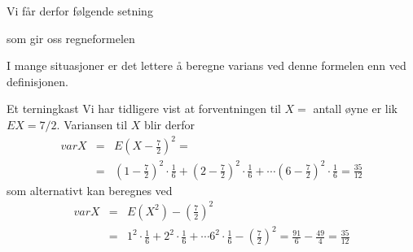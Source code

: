 \noindent Vi får derfor følgende setning

\begin{center} \framebox[10cm]{\begin{minipage}{9cm}
 \[ \mbox{\ \ \ V3. \ \ \ \ }varX = E(X^2) - (EX)^2 \]
\mbox{} \end{minipage}} \end{center}
\noindent som gir oss regneformelen

\begin{center} \framebox[10cm]{\begin{minipage}{9cm}
\[ \mbox{\ \ \ V4. \ \ \ \ }  varX = \sum_{x}x^2p(x)-{(EX)}^2 \]
\mbox{} \end{minipage}} \end{center}

\noindent I mange situasjoner er det lettere å beregne varians ved denne
formelen enn ved definisjonen.\\                    
                                                      
\begin{eksempel}{Et terningkast}
Vi har tidligere vist at forventningen til $X =$ antall øyne er
lik $EX=7/2$. Variansen til $X$ blir derfor
\begin{eqnarray*}
 varX&=&E{(X-\frac{7}{2})}^2= \\ &=& {(1-\frac{7}{2})}^2 \cdot
\frac{1}{6}+ {(2-\frac{7}{2})}^2 \cdot \frac{1}{6}+ \cdots
{(6-\frac{7}{2})}^2 \cdot \frac{1}{6}=\frac{35}{12}
\end{eqnarray*}
\noindent som alternativt kan beregnes ved
\begin{eqnarray*}
 varX&=&E(X^2)- {(\frac{7}{2})}^2 \\
 &=& 1^2 \cdot \frac{1}{6}+2^2 \cdot \frac{1}{6}
        + \cdots 6^2 \cdot \frac{1}{6}-{(\frac{7}{2})}^2=
   \frac{91}{6}-\frac{49}{4}=\frac{35}{12}
\end{eqnarray*}
\end{eksempel} 

